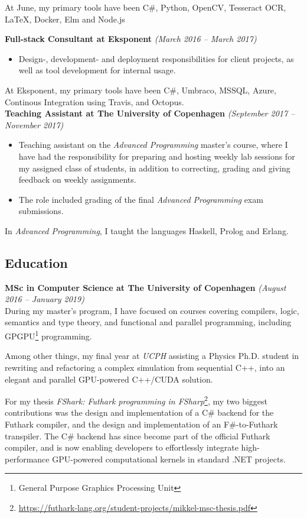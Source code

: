 \documentclass[10pt, a4paper]{article}
\begin{document}
  At June, my primary tools have been C\#, Python, OpenCV, Tesseract OCR, LaTeX, Docker, Elm and Node.js

\textbf{Full-stack Consultant at Eksponent} \textit{(March 2016 -- March 2017)}
\begin{itemize}[topsep=0pt]
\item 
Design-, development- and
deployment responsibilities for client projects, as well as tool development for
internal usage.
\end{itemize}
At Eksponent, my primary tools have been C\#, Umbraco, MSSQL, Azure, Continous
Integration using Travis, and Octopus.\\

\textbf{Teaching Assistant at The University of Copenhagen} \textit{(September 2017 -- November 2017)}
\begin{itemize}[topsep=0pt]
\item 
  Teaching assistant on the \textit{Advanced Programming} master's course, where
  I have had the responsibility for preparing and hosting weekly lab sessions
  for my assigned class of students, in addition to correcting, grading and
  giving feedback on weekly assignments.
\item
  The role included grading of the final \textit{Advanced Programming}
  exam submissions.
\end{itemize}

  In \textit{Advanced Programming}, I taught the languages Haskell, Prolog and
  Erlang.

\subsection*{Education}
\textbf{MSc in Computer Science at The University of Copenhagen} \textit{(August 2016 -- January 2019)}\\
  During my master's program, I have focused on courses covering compilers,
  logic, semantics and type theory, and functional and parallel programming,
  including GPGPU\footnote{General Purpose Graphics Processing Unit} programming.

  Among other things, my final year at \textit{UCPH} assisting a Physics Ph.D. student in
  rewriting and refactoring a complex simulation
  from sequential C++, into an elegant and parallel GPU-powered C++/CUDA solution.
  
  For my thesis \textit{FShark: Futhark programming in
    FSharp}\footnote{\url{https://futhark-lang.org/student-projects/mikkel-msc-thesis.pdf}},
  my two biggest contributions was the design and implementation of a C\# backend for
  the Futhark compiler, and the design and implementation of an F\#-to-Futhark transpiler.
  The C\# backend has since become part of the official Futhark compiler, and is
  now enabling developers to effortlessly integrate high-performance GPU-powered
  computational kernels in standard .NET projects.
\end{document}
